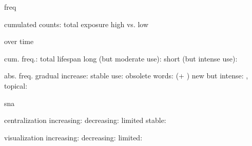 
freq

  cumulated counts: total exposure
    high vs. low

  over time

    cum. freq.: total lifespan
      long (but moderate use): 
      short (but intense use): 

    abs. freq.
      gradual increase: 
      stable use: 
      obsolete words:  (+ )
      new but intense: , 
      topical: 

sna

  centralization
    increasing:
    decreasing:
    limited
    stable: 

  visualization
    increasing: 
    decreasing: 
    limited: 

